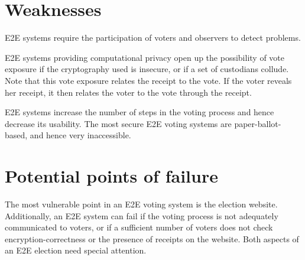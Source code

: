 \section{Weaknesses}

E2E systems require the participation of voters and observers to detect
problems.

E2E systems providing computational privacy open up the possibility of vote
exposure if the cryptography used is insecure, or if a set of custodians
collude. Note that this vote exposure relates the receipt to the vote. If
the voter reveals her receipt, it then relates the voter to the vote through
the receipt.

E2E systems increase the number of steps in the voting process and hence
decrease its usability. The most secure E2E voting systems are
paper-ballot-based, and hence very inaccessible.

\section{Potential points of failure}

The most vulnerable point in an E2E voting system is the election website.
Additionally, an E2E system can fail if the voting process is not adequately
communicated to voters, or if a sufficient number of voters does not check
encryption-correctness or the presence of receipts on the website. Both
aspects of an E2E election need special attention.

